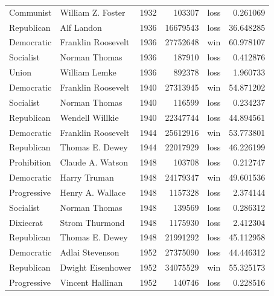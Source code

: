 \documentclass[
  letterpaper,
  DIV=11,
  numbers=noendperiod]{scrreprt}
\begin{document}
\begin{tabular}{llrrlr}
Communist             &       William Z. Foster &  1932 &        103307 &   loss &   0.261069 \\
Republican            &              Alf Landon &  1936 &      16679543 &   loss &  36.648285 \\
Democratic            &      Franklin Roosevelt &  1936 &      27752648 &    win &  60.978107 \\
Socialist             &           Norman Thomas &  1936 &        187910 &   loss &   0.412876 \\
Union                 &           William Lemke &  1936 &        892378 &   loss &   1.960733 \\
Democratic            &      Franklin Roosevelt &  1940 &      27313945 &    win &  54.871202 \\
Socialist             &           Norman Thomas &  1940 &        116599 &   loss &   0.234237 \\
Republican            &         Wendell Willkie &  1940 &      22347744 &   loss &  44.894561 \\
Democratic            &      Franklin Roosevelt &  1944 &      25612916 &    win &  53.773801 \\
Republican            &         Thomas E. Dewey &  1944 &      22017929 &   loss &  46.226199 \\
Prohibition           &        Claude A. Watson &  1948 &        103708 &   loss &   0.212747 \\
Democratic            &            Harry Truman &  1948 &      24179347 &    win &  49.601536 \\
Progressive           &        Henry A. Wallace &  1948 &       1157328 &   loss &   2.374144 \\
Socialist             &           Norman Thomas &  1948 &        139569 &   loss &   0.286312 \\
Dixiecrat             &          Strom Thurmond &  1948 &       1175930 &   loss &   2.412304 \\
Republican            &         Thomas E. Dewey &  1948 &      21991292 &   loss &  45.112958 \\
Democratic            &         Adlai Stevenson &  1952 &      27375090 &   loss &  44.446312 \\
Republican            &       Dwight Eisenhower &  1952 &      34075529 &    win &  55.325173 \\
Progressive           &        Vincent Hallinan &  1952 &        140746 &   loss &   0.228516 \\

\end{tabular}
\end{document}
